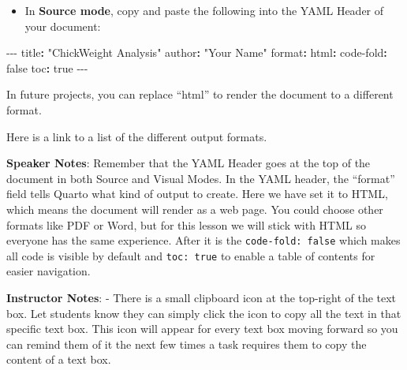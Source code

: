 \documentclass[
  letterpaper,
  DIV=11,
  numbers=noendperiod]{scrartcl}
\newenvironment{Shaded}{\begin{snugshade}}{\end{snugshade}}
\newcommand{\AttributeTok}[1]{\textcolor[rgb]{0.40,0.45,0.13}{#1}}
\newcommand{\CharTok}[1]{\textcolor[rgb]{0.13,0.47,0.30}{#1}}
\newcommand{\FunctionTok}[1]{\textcolor[rgb]{0.28,0.35,0.67}{#1}}
\newcommand{\KeywordTok}[1]{\textcolor[rgb]{0.00,0.23,0.31}{\textbf{#1}}}
\newcommand{\PreprocessorTok}[1]{\textcolor[rgb]{0.68,0.00,0.00}{#1}}
\newcommand{\StringTok}[1]{\textcolor[rgb]{0.13,0.47,0.30}{#1}}
\providecommand{\tightlist}{%
  \setlength{\itemsep}{0pt}\setlength{\parskip}{0pt}}
\begin{document}
\begin{itemize}
\tightlist
\item[$\square$]
  In \textbf{Source mode}, copy and paste the following into the YAML
  Header of your document:
\end{itemize}

\begin{Shaded}
\begin{Highlighting}[]
\PreprocessorTok{{-}{-}{-}}
\FunctionTok{title}\KeywordTok{:}\AttributeTok{ }\StringTok{"ChickWeight Analysis"}
\FunctionTok{author}\KeywordTok{:}\AttributeTok{ }\StringTok{"Your Name"}
\FunctionTok{format}\KeywordTok{:}
\AttributeTok{  }\FunctionTok{html}\KeywordTok{:}
\AttributeTok{    }\FunctionTok{code{-}fold}\KeywordTok{:}\AttributeTok{ }\CharTok{false}
\AttributeTok{    }\FunctionTok{toc}\KeywordTok{:}\AttributeTok{ }\CharTok{true}
\PreprocessorTok{{-}{-}{-}}
\end{Highlighting}
\end{Shaded}

\begin{tcolorbox}[enhanced jigsaw, opacitybacktitle=0.6, toptitle=1mm, colbacktitle=quarto-callout-note-color!10!white, toprule=.15mm, left=2mm, colback=white, colframe=quarto-callout-note-color-frame, opacityback=0, bottomtitle=1mm, breakable, titlerule=0mm, rightrule=.15mm, arc=.35mm, title=\textcolor{quarto-callout-note-color}{\faInfo}\hspace{0.5em}{Output format}, bottomrule=.15mm, coltitle=black, leftrule=.75mm]

In future projects, you can replace ``html'' to render the document to a
different format.

Here is a link to a list of the different output formats.

\end{tcolorbox}

\textbf{Speaker Notes}: Remember that the YAML Header goes at the top of
the document in both Source and Visual Modes. In the YAML header, the
``format'' field tells Quarto what kind of output to create. Here we
have set it to HTML, which means the document will render as a web page.
You could choose other formats like PDF or Word, but for this lesson we
will stick with HTML so everyone has the same experience. After it is
the \texttt{code-fold:\ false} which makes all code is visible by
default and \texttt{toc:\ true} to enable a table of contents for easier
navigation.

\textbf{Instructor Notes}: - There is a small clipboard icon at the
top-right of the text box. Let students know they can simply click the
icon to copy all the text in that specific text box. This icon will
appear for every text box moving forward so you can remind them of it
the next few times a task requires them to copy the content of a text
box.
\end{document}

